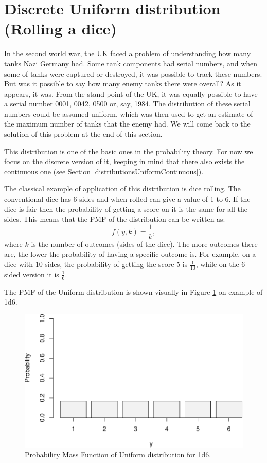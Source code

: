 \documentclass[
]{book}
\theoremstyle{definition}
\theoremstyle{definition}
\theoremstyle{definition}
\theoremstyle{definition}
\theoremstyle{remark}
\begin{document}
\section{Discrete Uniform distribution (Rolling a dice)}\label{distributionUniform}

In the second world war, the UK faced a problem of understanding how many tanks Nazi Germany had. Some tank components had serial numbers, and when some of tanks were captured or destroyed, it was possible to track these numbers. But was it possible to say how many enemy tanks there were overall? As it appears, it was. From the stand point of the UK, it was equally possible to have a serial number 0001, 0042, 0500 or, say, 1984. The distribution of these serial numbers could be assumed uniform, which was then used to get an estimate of the maximum number of tanks that the enemy had. We will come back to the solution of this problem at the end of this section.

This distribution is one of the basic ones in the probability theory. For now we focus on the discrete version of it, keeping in mind that there also exists the continuous one (see Section \ref{distributionsUniformContinuous}).

The classical example of application of this distribution is dice rolling. The conventional dice has 6 sides and when rolled can give a value of 1 to 6. If the dice is fair then the probability of getting a score on it is the same for all the sides. This means that the PMF of the distribution can be written as:
\begin{equation}
    f(y, k) = \frac{1}{k},
    \label{eq:UniformPMF}
\end{equation}
where \(k\) is the number of outcomes (sides of the dice). The more outcomes there are, the lower the probability of having a specific outcome is. For example, on a dice with 10 sides, the probability of getting the score 5 is \(\frac{1}{10}\), while on the 6-sided version it is \(\frac{1}{6}\).

The PMF of the Uniform distribution is shown visually in Figure \ref{fig:uniformPMF} on example of 1d6.

\begin{figure}
\centering
\includegraphics{Svetunkov---Statistics-for-Business-Analytics_files/figure-latex/uniformPMF-1.pdf}
\caption{\label{fig:uniformPMF}Probability Mass Function of Uniform distribution for 1d6.}
\end{figure}
\end{document}
